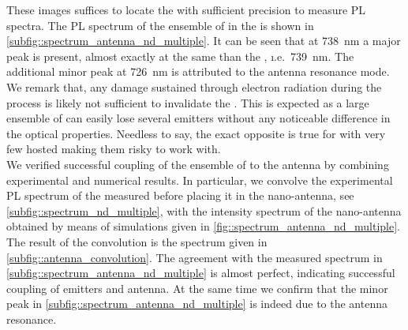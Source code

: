 			These images suffices to locate the \nd with sufficient precision to measure PL spectra.
			The PL spectrum of the ensemble of \sivs in the \nd is shown in \cref{subfig::spectrum_antenna_nd_multiple}. It can be seen that at \SI{738}{\nm} a major peak is present, almost exactly at the same \wl than the \siv \zpl, \i.e.\ \SI{739}{\nm}. The additional minor peak at \SI{726}{\nm} is attributed to the antenna resonance mode. We remark that, any damage sustained through electron radiation during the \pp process is likely not sufficient to invalidate the \nd. This is expected as a large ensemble of \sivs can easily lose several emitters without any noticeable difference in the optical properties. Needless to say, the exact opposite is true for \nds with very few hosted \sivs making them risky to work with.
			\\
			We verified successful coupling of the ensemble of \sivs to the antenna by combining experimental and numerical results. In particular, we convolve the experimental PL spectrum of the \nd measured before placing it in the nano-antenna, see \cref{subfig::spectrum_nd_multiple},  with the intensity spectrum of the nano-antenna obtained by means of simulations given in \cref{fig::spectrum_antenna_nd_multiple}.
			The result of the convolution is the spectrum given in \cref{subfig::antenna_convolution}. The agreement with the measured spectrum in \cref{subfig::spectrum_antenna_nd_multiple} is almost perfect, indicating successful coupling of emitters and antenna. At the same time we confirm that the minor peak in \cref{subfig::spectrum_antenna_nd_multiple} is indeed due to the antenna resonance.

